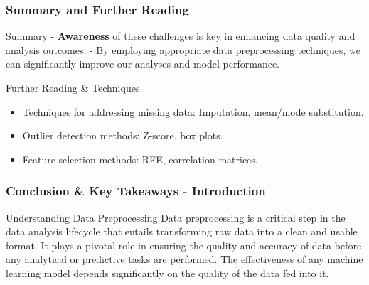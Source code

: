 \documentclass[aspectratio=169]{beamer}
\begin{document}
\begin{frame}[fragile]
    \frametitle{Summary and Further Reading}
    \begin{block}{Summary}
        - \textbf{Awareness} of these challenges is key in enhancing data quality and analysis outcomes.
        - By employing appropriate data preprocessing techniques, we can significantly improve our analyses and model performance.
    \end{block}

    \begin{block}{Further Reading \& Techniques}
        \begin{itemize}
            \item Techniques for addressing missing data: Imputation, mean/mode substitution.
            \item Outlier detection methods: Z-score, box plots.
            \item Feature selection methods: RFE, correlation matrices.
        \end{itemize}
    \end{block}
\end{frame}

\begin{frame}[fragile]
    \frametitle{Conclusion \& Key Takeaways - Introduction}
    \begin{block}{Understanding Data Preprocessing}
        Data preprocessing is a critical step in the data analysis lifecycle that entails transforming raw data into a clean and usable format. It plays a pivotal role in ensuring the quality and accuracy of data before any analytical or predictive tasks are performed. The effectiveness of any machine learning model depends significantly on the quality of the data fed into it.
    \end{block}
\end{frame}
\end{document}
